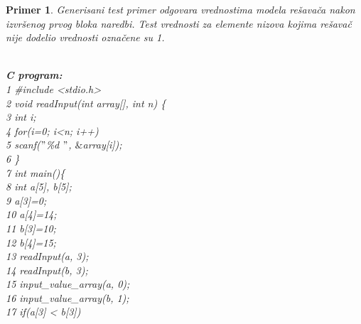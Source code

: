 \documentclass[12pt,oneside]{memoir}
\newcommand\tab[1][0.5cm]{\hspace*{#1}}
\newtheorem{primer}{Primer}
\begin{document}
\begin{primer} Generisani test primer odgovara vrednostima modela rešavača nakon izvršenog prvog bloka naredbi. Test vrednosti za elemente nizova kojima rešavač nije dodelio vrednosti označene su 1.\\ \\
\hspace{-0.6cm} \label{example24}
\begin{minipage}[b]{0.5\textwidth}
\textbf{C program:}\\
1 \hspace{0.1cm} \#include <stdio.h> \\
2 \hspace{0.1cm} void readInput(int array[], int n) \{ \\
3	\hspace{0.15cm} \tab int i; \\
4	\hspace{0.15cm} \tab for(i=0; i<n; i++) \\
5	\hspace{0.15cm} \tab \tab	scanf($"$\%d $"$, $\&$array[i]); \\
6 \hspace{0.1cm} \} \\
7 \hspace{0.1cm} int main()\{ \\
8	\hspace{0.15cm} \tab int a[5], b[5];\\
9	\hspace{0.15cm} \tab a[3]=0; \\
10	\hspace{-0.08cm} \tab a[4]=14; \\
11	\hspace{-0.08cm} \tab b[3]=10; \\
12	\hspace{-0.08cm} \tab b[4]=15; \\
13  \hspace{-0.08cm} \tab readInput(a, 3); \\
14  \hspace{-0.08cm} \tab readInput(b, 3); \\
15	\hspace{-0.08cm} \tab input\_value\_array(a, 0); \\
16	\hspace{-0.08cm} \tab input\_value\_array(b, 1); \\
17  \hspace{-0.08cm} \tab if(a[3] < b[3]) \\

\end{minipage}
\end{primer}
\end{document}
